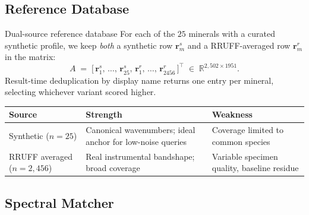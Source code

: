 \documentclass[10pt,aspectratio=169,xcolor=dvipsnames]{beamer}
\begin{document}
\subsection{Reference Database}

\begin{frame}{Dual-source reference database}
  For each of the $25$ minerals with a curated synthetic profile, we keep
  \emph{both} a synthetic row $\mathbf{r}^{s}_m$ and a RRUFF-averaged row
  $\mathbf{r}^{r}_m$ in the matrix:
  \[
    A \;=\; \bigl[\, \mathbf{r}^{s}_1,\, \dots,\, \mathbf{r}^{s}_{25},\,
                    \mathbf{r}^{r}_1,\, \dots,\, \mathbf{r}^{r}_{2456} \,\bigr]^{\top}
    \;\in\; \mathbb{R}^{2{,}502 \times 1951}.
  \]
  Result-time deduplication by display name returns one entry per mineral,
  selecting whichever variant scored higher.
  \medskip

  \begin{table}\centering\small
    \begin{tabular}{@{}lp{}p{}@{}}
      \toprule
      \textbf{Source} & \textbf{Strength} & \textbf{Weakness} \\
      \midrule
      Synthetic ($n=25$) &
        Canonical wavenumbers; ideal anchor for low-noise queries &
        Coverage limited to common species \\
      RRUFF averaged ($n=2{,}456$) &
        Real instrumental bandshape; broad coverage &
        Variable specimen quality, baseline residue \\
      \bottomrule
    \end{tabular}
  \end{table}
\end{frame}

\subsection{Spectral Matcher}
\end{document}
